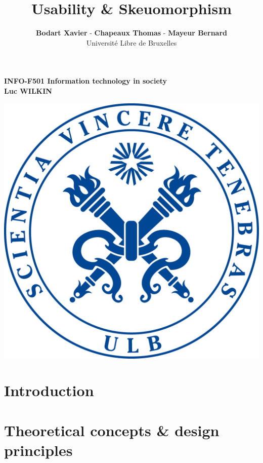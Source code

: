 \documentclass[a4paper,11pt] {article}
\theoremstyle{definition}
\begin{document}
\title{\textbf{Usability \& Skeuomorphism}}
\author{\textbf{Bodart Xavier} - \textbf{Chapeaux Thomas} - \textbf{Mayeur Bernard} \\
Université Libre de Bruxelles}

\maketitle
\begin{center}

\textbf{INFO-F501 Information technology in society\\
Luc WILKIN}
\end{center}
\begin{center}

\includegraphics[scale=0.15]{ULBjea.jpg} 
\end{center}
\pagebreak
\tableofcontents
\pagebreak
\section{Introduction}
\section{Theoretical concepts \& design principles}
\end{document}
